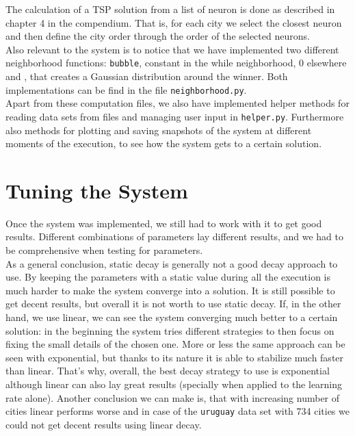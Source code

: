 \documentclass[11pt]{article}
\begin{document}
The calculation of a TSP solution from a list of neuron is done as described in
chapter 4 in the compendium. That is, for each city we select the closest neuron
and then define the city order through the order of the selected neurons.\\

Also relevant to the system is to notice that we have implemented two different
neighborhood functions: \texttt{bubble}, constant in the while neighborhood, 0
elsewhere and , that creates a Gaussian distribution around the
winner. Both implementations can be find in the file
\texttt{neighborhood.py}.\\

Apart from these computation files, we also have implemented helper methods for
reading data sets from files and managing user input  in \texttt{helper.py}.
Furthermore also methods for plotting and saving snapshots of the system at
different moments of the execution, to see how the system gets to a certain
solution.\\

\section{Tuning the System}

Once the system was implemented, we still had to work with it to get good
results. Different combinations of parameters lay different results,
and we had to be comprehensive when testing for parameters.\\

As a general conclusion, static decay is generally not a good decay approach to
use. By keeping the parameters with a static value during all the execution is
much harder to make the system converge into a solution. It is still possible to
get decent results, but overall it is not worth to use static decay. If, in the
other hand, we use linear, we can see the system converging much better to a
certain solution: in the beginning the system tries different strategies to then
focus on fixing the small details of the chosen one. More or less the same
approach can be seen with exponential, but thanks to its nature it is able to
stabilize much faster than linear. That's why, overall, the best decay strategy
to use is exponential although linear can also lay great results (specially when
applied to the learning rate alone). Another conclusion we can make is, that
with increasing number of cities linear performs worse and in case of the
\texttt{uruguay} data set with 734 cities we could not get decent results using
linear decay.\\
\end{document}
